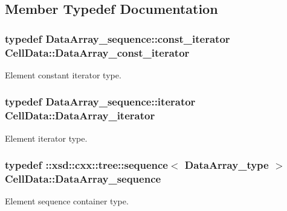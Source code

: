\subsection{Member Typedef Documentation}
\hypertarget{classCellData_a8213ea10f002fac23b5555ca0b2b2a21}{}
\subsubsection[{Data\+Array\+\_\+const\+\_\+iterator}]{\setlength{\rightskip}{0pt plus 5cm}typedef Data\+Array\+\_\+sequence\+::const\+\_\+iterator {\bf Cell\+Data\+::\+Data\+Array\+\_\+const\+\_\+iterator}}\label{classCellData_a8213ea10f002fac23b5555ca0b2b2a21}


Element constant iterator type. 

\hypertarget{classCellData_abe0f5b0713690cc81703132bcdccd51f}{}
\subsubsection[{Data\+Array\+\_\+iterator}]{\setlength{\rightskip}{0pt plus 5cm}typedef Data\+Array\+\_\+sequence\+::iterator {\bf Cell\+Data\+::\+Data\+Array\+\_\+iterator}}\label{classCellData_abe0f5b0713690cc81703132bcdccd51f}


Element iterator type. 

\hypertarget{classCellData_a52b0c8e18ccdb06ed9e6ae76cd809c4a}{}
\subsubsection[{Data\+Array\+\_\+sequence}]{\setlength{\rightskip}{0pt plus 5cm}typedef \+::xsd\+::cxx\+::tree\+::sequence$<$ {\bf Data\+Array\+\_\+type} $>$ {\bf Cell\+Data\+::\+Data\+Array\+\_\+sequence}}\label{classCellData_a52b0c8e18ccdb06ed9e6ae76cd809c4a}


Element sequence container type. 

\hypertarget{classCellData_a03e76eec5af05a6ac5512e9cb80300bd}{}
